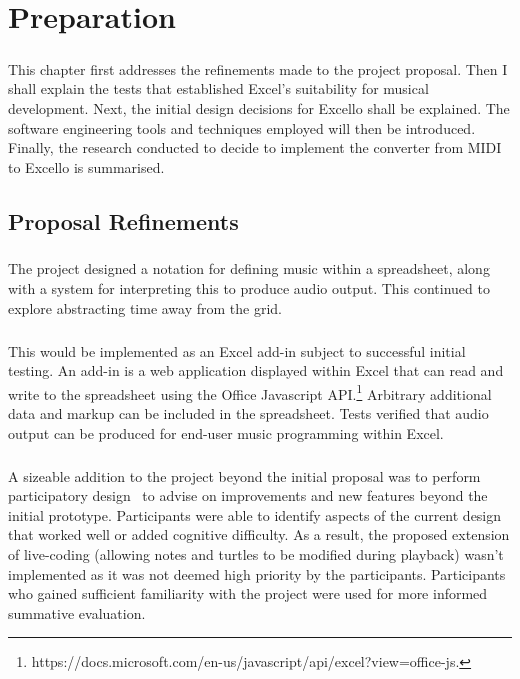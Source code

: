 
\chapter{Preparation}

\paragraph{} This chapter first addresses the refinements made to the project proposal. Then I shall explain the tests that established Excel's suitability for musical development. Next, the initial design decisions for Excello shall be explained. The software engineering tools and techniques employed will then be introduced. Finally, the research conducted to decide to implement the converter from MIDI to Excello is summarised.

\section{Proposal Refinements}

\paragraph{} The project designed a notation for defining music within a spreadsheet, along with a system for interpreting this to produce audio output. This continued to explore abstracting time away from the grid.

\paragraph{} This would be implemented as an Excel add-in subject to successful initial testing. An add-in is a web application displayed within Excel that can read and write to the spreadsheet using the Office Javascript API.\footnote{https://docs.microsoft.com/en-us/javascript/api/excel?view=office-js.} Arbitrary additional data and markup can be included in the spreadsheet. Tests verified that audio output can be produced for end-user music programming within Excel.

\paragraph{} A sizeable addition to the project beyond the initial proposal was to perform participatory design~\cite{muller:pd} to advise on improvements and new features beyond the initial prototype. Participants were able to identify aspects of the current design that worked well or added cognitive difficulty. As a result, the proposed extension of live-coding (allowing notes and turtles to be modified during playback) wasn't implemented as it was not deemed high priority by the participants. Participants who gained sufficient familiarity with the project were used for more informed summative evaluation.

